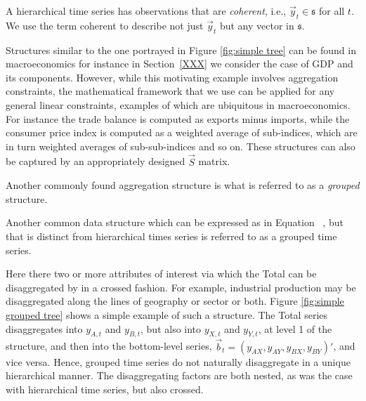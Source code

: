\documentclass[graybox]{svmult}
\begin{document}
\begin{property}
A hierarchical time series has observations that are \textit{coherent}, i.e., $\vec{y}_{t} \in \mathfrak{s}$ for all $t$. We use the term coherent to describe not just $\vec{y}_t$ but any vector in $\mathfrak{s}$.
  \label{def:coherence}
\end{property}


Structures similar to the one portrayed in Figure \ref{fig:simple tree} can be found in macroeconomics for instance in Section~\ref{XXX} we consider the case of GDP and its components.  However, while this motivating example involves aggregation constraints, the mathematical framework that we use can be applied for any general linear constraints, examples of which are ubiquitous in macroeconomics. For instance the trade balance is computed as exports minus imports, while the consumer price index is computed as a weighted average of sub-indices, which are in turn weighted averages of sub-sub-indices and so on.  These structures can also be captured by an appropriately designed $\vec{S}$ matrix.

Another commonly found aggregation structure is what is referred to as a \textit{grouped} structure. 

Another common data structure which can be expressed as in Equation~ , but that is distinct from hierarchical times series is referred to as a grouped time series.

Here there two or more attributes of interest via which the Total can be disaggregated by in a crossed fashion. For example, industrial production may be disaggregated along the lines of geography or sector or both. Figure \ref{fig:simple grouped tree} shows a simple example of such a structure. The Total series disaggregates into $y_{A,t}$ and $y_{B,t}$, but also into $y_{X,t}$ and $y_{Y,t}$, at level 1 of the structure, and then into the bottom-level series, $\vec{b}_t=(y_{AX}, y_{AY}, y_{BX}, y_{BY})'$, and vice versa. Hence, grouped time series do not naturally disaggregate in a unique hierarchical manner. The disaggregating factors are both nested, as was the case with hierarchical time series, but also crossed.
\end{document}

